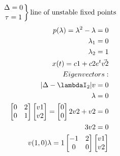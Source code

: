 \documentclass[a4paper,10pt]{article}
\begin{document}
\begin{enumerate}
\begin{enumerate}
\begin{equation}
                \end{equation}
                \begin{equation}
                    \left.
                    \Delta =  0 \atop
                    \tau=1
                    \right\}{\text{line of unstable fixed points}}
                \end{equation}
                \begin{equation}
                    \begin{aligned}
                        p(\lambda)= \lambda^{2}-\lambda=0\\
                        \lambda_{1}=0\\
                        \lambda_{2}=1\\
                        x(t) = c1 + c2e^{t}\vec{v2}\\
                        Eigenvectors:\\
                        \abs{\Delta - \lambdaI_{2}}v=0\\
                        \lambda=0\\
                        \begin{bmatrix}
                            0 & 2\\
                            0 &1 
                        \end{bmatrix}
                        \begin{bmatrix}
                            v1\\
                            v2
                        \end{bmatrix}
                        = 
                        \begin{bmatrix}
                            0\\
                            0
                        \end{bmatrix}
                        2v2 + v2=0\\
                        3v2=0\\
                        v(1,0)
                        \lambda=1
                        \begin{bmatrix}
                            -1 & 2\\
                            0 & 0 
                        \end{bmatrix}
                        \begin{bmatrix}
                            v1\\
                            v2

\end{bmatrix}
\end{aligned}
\end{equation}
\end{enumerate}
\end{enumerate}
\end{document}
